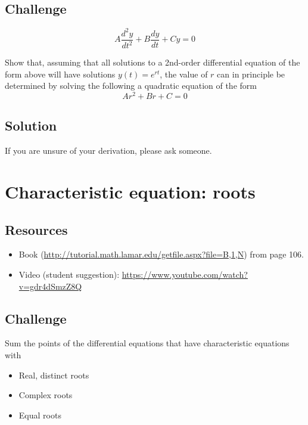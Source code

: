\subsection*{Challenge}
\begin{equation}
    A \frac{d^2y}{dt^2} + B \frac{dy}{dt} + C y = 0
\end{equation}

Show that, assuming that all solutions to a 2nd-order differential equation of the form above will have solutions $y(t)=e^{rt}$, the value of $r$ can in principle be determined by solving the following a quadratic equation of the form
\begin{equation}
    A r^2 + Br + C = 0
\end{equation}

\subsection*{Solution}
If you are unsure of your derivation, please ask someone.




\newpage
\section{Characteristic equation: roots}

\subsection*{Resources}
\begin{itemize}
    \item Book (\url{http://tutorial.math.lamar.edu/getfile.aspx?file=B,1,N}) from page 106.
    \item Video (student suggestion): \url{https://www.youtube.com/watch?v=gdr4dSmzZ8Q}
\end{itemize}

\subsection*{Challenge}
Sum the points of the differential equations that have characteristic equations with
\begin{itemize}
    \item Real, distinct roots
    \item Complex roots
    \item Equal roots
\end{itemize}

